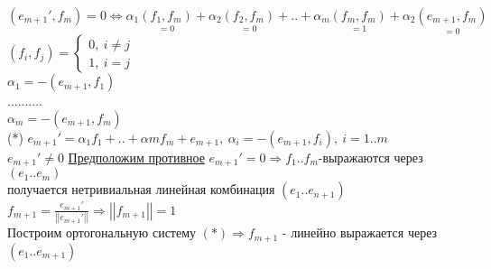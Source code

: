 $(e_{m+1}',f_m)=0 \Leftrightarrow \alpha_1 \underset {=0} {(f_1,f_m)} + \alpha_2 \underset {=0} {(f_2,f_m)} + .. + \alpha_m \underset {=1} {(f_m,f_m)} + \alpha_2 \underset {=0} {(e_{m+1},f_m)}$ \\
$(f_i,f_j) = \left\{ \begin{matrix}
\mbox{$0, \ i \ne j $} \\
\mbox{$1, \ i=j$}
\end{matrix}\right.$ \\
$\alpha_1=-(e_{m+1},f_1)$ \\
.......... \\
$\alpha_m=-(e_{m+1},f_m)$ \\
(*) $e_{m+1}'=\alpha_1 f_1 + .. + \alpha m f_m + e_{m+1}, \ \alpha_i=-(e_{m+1},f_i), \ i=1..m$ \\
$e_{m+1}' \ne 0 $ \underline{Предположим противное} $e_{m+1}'=0 \Rightarrow f_1..f_m$-выражаются через $(e_1..e_m)$ \\
получается нетривиальная линейная комбинация $(e_1..e_{n+1})$ \\
$f_{m+1}=\frac{e_{m+1}'}{\left| \left| e_{m+1}' \right| \right|} \Rightarrow \left| \left| f_{m+1} \right| \right| =1 $ \\
Построим ортогональную систему $ (*) \Rightarrow f_{m+1}$ - линейно выражается через $(e_1..e_{m+1})$ \\ 